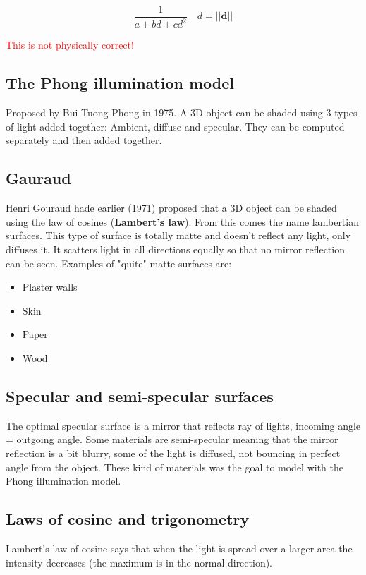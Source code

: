 		\begin{equation}
			\frac{1} {a+bd+cd^{2}} \quad	d = ||\textbf{d}||
		\end{equation}

	\textcolor{red}{This is not physically correct!} 

	\subsection*{The Phong illumination model}
	Proposed by Bui Tuong Phong in 1975. A 3D object can be shaded using 3 types of light added together: Ambient, diffuse and specular. They can be computed separately and then added together. 

	\subsection*{Gauraud}
	Henri Gouraud hade earlier (1971) proposed that a 3D object can be shaded using the law of cosines (\textbf{Lambert's law}). From this comes the name lambertian surfaces. This type of surface is totally matte and doesn't reflect any light, only diffuses it. It scatters light in all directions equally so that no mirror reflection can be seen. Examples of "quite" matte surfaces are:
		\begin{itemize}
			\item Plaster walls
			\item Skin
			\item Paper
			\item Wood
		\end{itemize}

	\subsection*{Specular and semi-specular surfaces}
	The optimal specular surface is a mirror that reflects ray of lights, incoming angle = outgoing angle. Some materials are semi-specular meaning that the mirror reflection is a bit blurry, some of the light is diffused, not bouncing in perfect angle from the object. These kind of materials was the goal to model with the Phong illumination model. 

	\subsection*{Laws of cosine and trigonometry}
	Lambert's law of cosine says that when the light is spread over a larger area the intensity decreases (the maximum is in the normal direction). 

